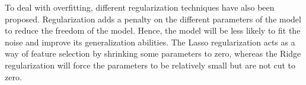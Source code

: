 To deal with overfitting, different regularization techniques have also been proposed. Regularization adds a penalty on the different parameters of the model to reduce the freedom of the model. Hence, the model will be less likely to fit the noise and improve its generalization abilities. The Lasso regularization acts as a way of feature selection by shrinking some parameters to zero, whereas the Ridge regularization will force the parameters to be relatively small but are not cut to zero.











